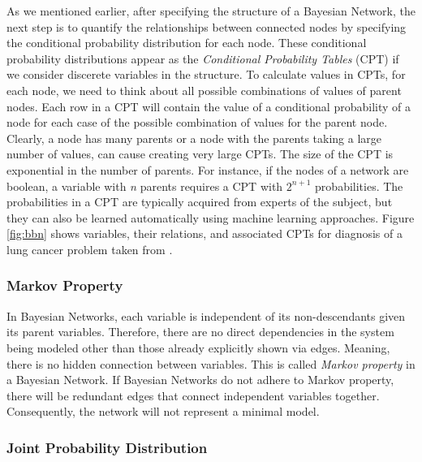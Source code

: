 \documentclass[11pt]{article}
\begin{document}
As we mentioned earlier, after specifying the structure of a Bayesian
Network, the next step is to quantify the relationships between connected nodes
by specifying the conditional probability distribution for each node. These
conditional probability distributions appear as the \textit{Conditional
Probability Tables} (CPT) if we consider discerete variables in the structure.
To calculate values in CPTs, for each node, we need to think about all possible
combinations of values of parent nodes. Each row in a CPT will contain the value
of a conditional probability of a node for each case of the possible combination
of values for the parent node. Clearly, a node has many parents or a node with
the parents taking a large number of values, can cause creating very large CPTs.
The size of the CPT is exponential in the number of parents. For instance, if
the nodes of a network are boolean, a variable with \textit{n} parents requires
a CPT with $2^{n+1}$ probabilities. The probabilities in a CPT are typically
acquired from experts of the subject, but they can also be learned automatically
using machine learning approaches. Figure \ref{fig:bbn} shows variables, their
relations, and associated CPTs for diagnosis of a lung cancer problem taken from
\cite{korb:bayesian-ai}.

\subsubsection{Markov Property}
\label{sec:markov-property}

In Bayesian Networks, each variable is independent of its non-descendants given
its parent variables. Therefore, there are no direct dependencies in the system
being modeled other than those already explicitly shown via edges. Meaning,
there is no hidden connection between variables. This is called \textit{Markov
property} in a Bayesian Network. If Bayesian Networks do not adhere to Markov
property, there will be redundant edges that connect independent variables
together. Consequently, the network will not represent a minimal model.

\subsubsection{Joint Probability Distribution}
\end{document}
